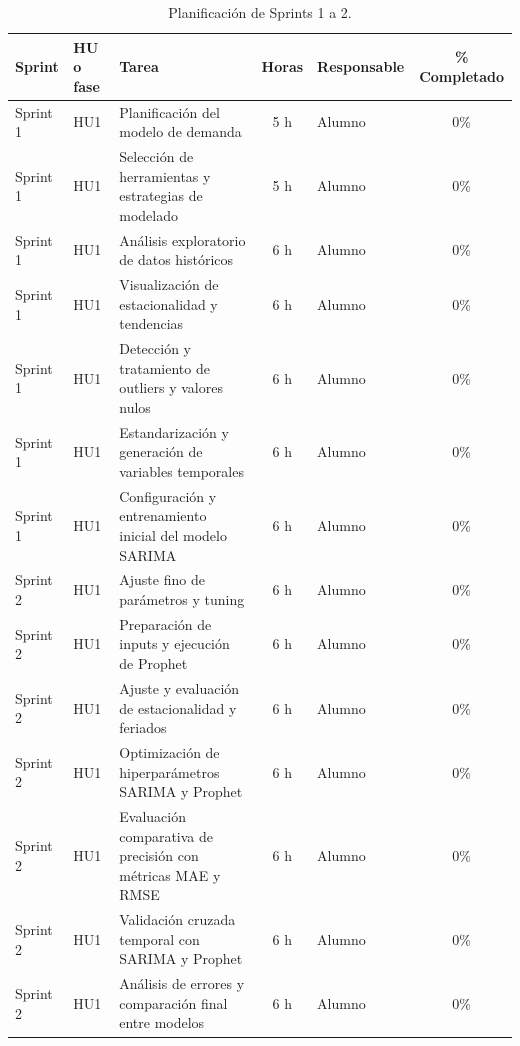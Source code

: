 \documentclass[
11pt, %
]{charter}
\begin{document}
\begin{table}[htpb]
\centering
\caption{Planificación de Sprints 1 a 2.}
\begin{tabularx}{\linewidth}{@{}|l|l|X|c|l|c|@{}}
\hline
\rowcolor[HTML]{C0C0C0}
Sprint & HU o fase & Tarea & Horas & Responsable & \% Completado \\ \hline
Sprint 1 & HU1 & Planificación del modelo de demanda & 5 h & Alumno & 0\% \\ \hline
Sprint 1 & HU1 & Selección de herramientas y estrategias de modelado & 5 h & Alumno & 0\% \\ \hline
Sprint 1 & HU1 & Análisis exploratorio de datos históricos & 6 h & Alumno & 0\% \\ \hline
Sprint 1 & HU1 & Visualización de estacionalidad y tendencias & 6 h & Alumno & 0\% \\ \hline
Sprint 1 & HU1 & Detección y tratamiento de outliers y valores nulos & 6 h & Alumno & 0\% \\ \hline
Sprint 1 & HU1 & Estandarización y generación de variables temporales & 6 h & Alumno & 0\% \\ \hline
Sprint 1 & HU1 & Configuración y entrenamiento inicial del modelo SARIMA & 6 h & Alumno & 0\% \\ \hline
Sprint 2 & HU1 & Ajuste fino de parámetros y tuning & 6 h & Alumno & 0\% \\ \hline
Sprint 2 & HU1 & Preparación de inputs y ejecución de Prophet & 6 h & Alumno & 0\% \\ \hline
Sprint 2 & HU1 & Ajuste y evaluación de estacionalidad y feriados & 6 h & Alumno & 0\% \\ \hline
Sprint 2 & HU1 & Optimización de hiperparámetros SARIMA y Prophet & 6 h & Alumno & 0\% \\ \hline
Sprint 2 & HU1 & Evaluación comparativa de precisión con métricas MAE y RMSE & 6 h & Alumno & 0\% \\ \hline
Sprint 2 & HU1 & Validación cruzada temporal con SARIMA y Prophet & 6 h & Alumno & 0\% \\ \hline
Sprint 2 & HU1 & Análisis de errores y comparación final entre modelos & 6 h & Alumno & 0\% \\ \hline
\end{tabularx}
\end{table}
\end{document}
